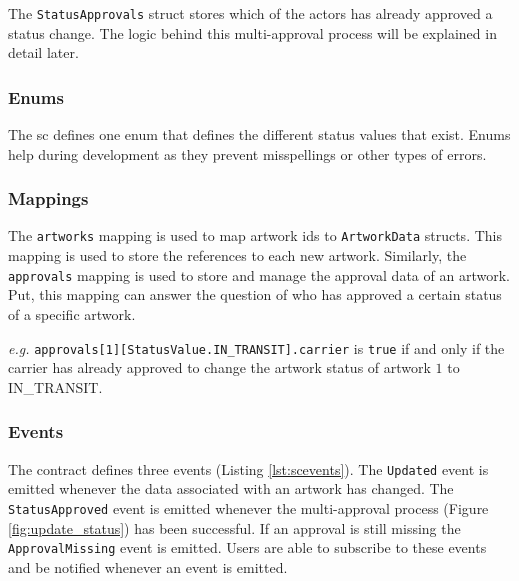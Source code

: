 The \texttt{StatusApprovals} struct stores which of the actors has already approved a status change. The logic behind this multi-approval process will be explained in detail later.



\subsubsection{Enums}
The \gls{sc} defines one enum that defines the different status values that exist. Enums help during development as they prevent misspellings or other types of errors.



\subsubsection{Mappings}
The \texttt{artworks} mapping is used to map artwork ids to \texttt{ArtworkData} structs. This mapping is used to store the references to each new artwork. Similarly, the \texttt{approvals} mapping is used to store and manage the approval data of an artwork. Put, this mapping can answer the question of who has approved a certain status of a specific artwork.



\textit{e.g.} \texttt{approvals[1][StatusValue.IN\_TRANSIT].carrier} is \texttt{true} if and only if the carrier has already approved to change the artwork status of artwork $1$ to IN\_TRANSIT.

\subsubsection{Events}
The contract defines three events (Listing \ref{lst:scevents}). The \texttt{Updated} event is emitted whenever the data associated with an artwork has changed. The \texttt{StatusApproved} event is emitted whenever the multi-approval process (Figure \ref{fig:update_status}) has been successful. If an approval is still missing the \texttt{ApprovalMissing} event is emitted. Users are able to subscribe to these events and be notified whenever an event is emitted.

